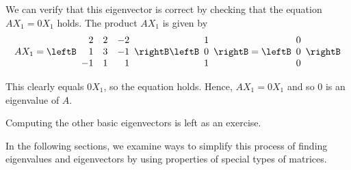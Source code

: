 \begin{solution}
We can verify that this eigenvector is correct by checking that the equation $AX_1 = 0 X_1$ holds.
The product $AX_1$ is given by
\begin{equation*}
AX_1=\leftB
\begin{array}{rrr}
2 & 2 & -2 \\
1 & 3 & -1 \\
-1 & 1 & 1
\end{array}
\rightB
\leftB
\begin{array}{r}
1 \\
0 \\
1
\end{array}
\rightB
=
\leftB
\begin{array}{r}
0 \\
0 \\
0
\end{array}
\rightB
\end{equation*}

This clearly equals $0X_1$, so the equation holds. Hence, $AX_1 = 0X_1$ and so $0$ is an eigenvalue of $A$.

Computing the other basic eigenvectors is left as an exercise. 
\end{solution}

In the following sections, we examine ways to simplify this process of finding eigenvalues and eigenvectors by using 
properties of special types of matrices.